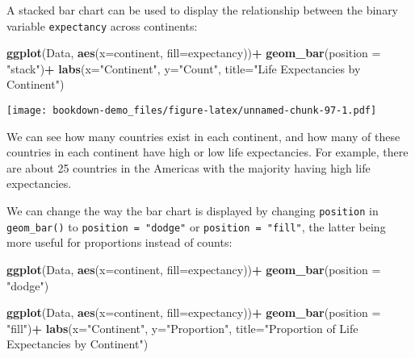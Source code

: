 \documentclass[
]{book}
\newenvironment{Shaded}{\begin{snugshade}}{\end{snugshade}}
\newcommand{\AttributeTok}[1]{\textcolor[rgb]{0.13,0.29,0.53}{#1}}
\newcommand{\FunctionTok}[1]{\textcolor[rgb]{0.13,0.29,0.53}{\textbf{#1}}}
\newcommand{\NormalTok}[1]{#1}
\newcommand{\SpecialCharTok}[1]{\textcolor[rgb]{0.81,0.36,0.00}{\textbf{#1}}}
\newcommand{\StringTok}[1]{\textcolor[rgb]{0.31,0.60,0.02}{#1}}
\begin{document}
A stacked bar chart can be used to display the relationship between the binary variable \texttt{expectancy} across continents:

\begin{Shaded}
\begin{Highlighting}[]
\FunctionTok{ggplot}\NormalTok{(Data, }\FunctionTok{aes}\NormalTok{(}\AttributeTok{x=}\NormalTok{continent, }\AttributeTok{fill=}\NormalTok{expectancy))}\SpecialCharTok{+}
  \FunctionTok{geom\_bar}\NormalTok{(}\AttributeTok{position =} \StringTok{"stack"}\NormalTok{)}\SpecialCharTok{+}
  \FunctionTok{labs}\NormalTok{(}\AttributeTok{x=}\StringTok{"Continent"}\NormalTok{, }\AttributeTok{y=}\StringTok{"Count"}\NormalTok{, }\AttributeTok{title=}\StringTok{"Life Expectancies by Continent"}\NormalTok{)}
\end{Highlighting}
\end{Shaded}

\texttt{[image: bookdown-demo\_files/figure-latex/unnamed-chunk-97-1.pdf]}

We can see how many countries exist in each continent, and how many of these countries in each continent have high or low life expectancies. For example, there are about 25 countries in the Americas with the majority having high life expectancies.

We can change the way the bar chart is displayed by changing \texttt{position} in \texttt{geom\_bar()} to \texttt{position\ =\ "dodge"} or \texttt{position\ =\ "fill"}, the latter being more useful for proportions instead of counts:

\begin{Shaded}
\begin{Highlighting}[]
\FunctionTok{ggplot}\NormalTok{(Data, }\FunctionTok{aes}\NormalTok{(}\AttributeTok{x=}\NormalTok{continent, }\AttributeTok{fill=}\NormalTok{expectancy))}\SpecialCharTok{+}
  \FunctionTok{geom\_bar}\NormalTok{(}\AttributeTok{position =} \StringTok{"dodge"}\NormalTok{) }
\end{Highlighting}
\end{Shaded}

\begin{Shaded}
\begin{Highlighting}[]
\FunctionTok{ggplot}\NormalTok{(Data, }\FunctionTok{aes}\NormalTok{(}\AttributeTok{x=}\NormalTok{continent, }\AttributeTok{fill=}\NormalTok{expectancy))}\SpecialCharTok{+}
  \FunctionTok{geom\_bar}\NormalTok{(}\AttributeTok{position =} \StringTok{"fill"}\NormalTok{)}\SpecialCharTok{+}
  \FunctionTok{labs}\NormalTok{(}\AttributeTok{x=}\StringTok{"Continent"}\NormalTok{, }\AttributeTok{y=}\StringTok{"Proportion"}\NormalTok{, }
       \AttributeTok{title=}\StringTok{"Proportion of Life Expectancies by Continent"}\NormalTok{)}
\end{Highlighting}
\end{Shaded}
\end{document}
